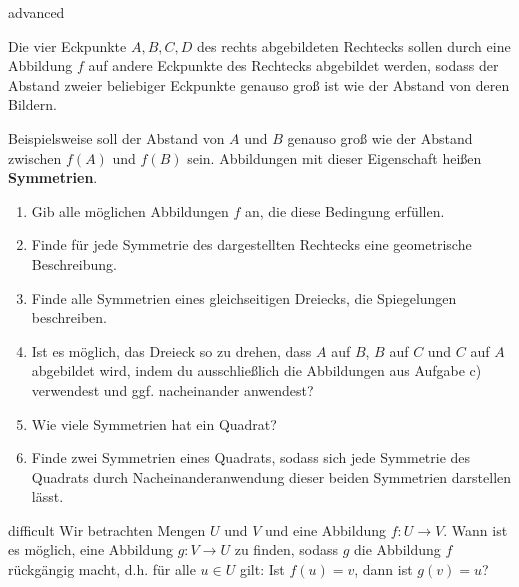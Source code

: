 \documentclass[../funktionen.tex]{subfiles}
\begin{document}
\begin{exercise}{advanced}
    
    Die vier Eckpunkte $A,B,C,D$ des rechts abgebildeten Rechtecks sollen durch eine Abbildung $f$ auf andere Eckpunkte
    des Rechtecks abgebildet werden, sodass der Abstand zweier beliebiger Eckpunkte genauso groß ist wie der Abstand von
    deren Bildern. 
    
    Beispielsweise soll der Abstand von $A$ und $B$ genauso groß wie der Abstand zwischen $f(A)$ und $f(B)$ sein.
    Abbildungen mit dieser Eigenschaft heißen \textbf{Symmetrien}.
    \begin{enumerate}
        \item Gib alle möglichen Abbildungen $f$ an, die diese Bedingung erfüllen.
        \item Finde für jede Symmetrie des dargestellten Rechtecks eine geometrische Beschreibung.
        \item Finde alle Symmetrien eines gleichseitigen Dreiecks, die Spiegelungen beschreiben.
        \item Ist es möglich, das Dreieck so zu drehen, dass $A$ auf $B$, $B$ auf $C$ und $C$ auf $A$ abgebildet wird,
            indem du ausschließlich die Abbildungen aus Aufgabe c) verwendest und ggf. nacheinander anwendest?
        \item Wie viele Symmetrien hat ein Quadrat?
        \item Finde zwei Symmetrien eines Quadrats, sodass sich jede Symmetrie des Quadrats durch Nacheinanderanwendung
            dieser beiden Symmetrien darstellen lässt.
    \end{enumerate}
\end{exercise}

\begin{exercise}{difficult}
    Wir betrachten Mengen $U$ und $V$ und eine Abbildung $f\colon U\rightarrow V$. Wann ist es möglich, eine Abbildung
    $g\colon V\rightarrow U$ zu finden, sodass $g$ die Abbildung $f$ rückgängig macht, d.h. für alle $u\in U$ gilt:
    Ist $f(u)=v$, dann ist $g(v)=u$?
\end{exercise}
\end{document}
